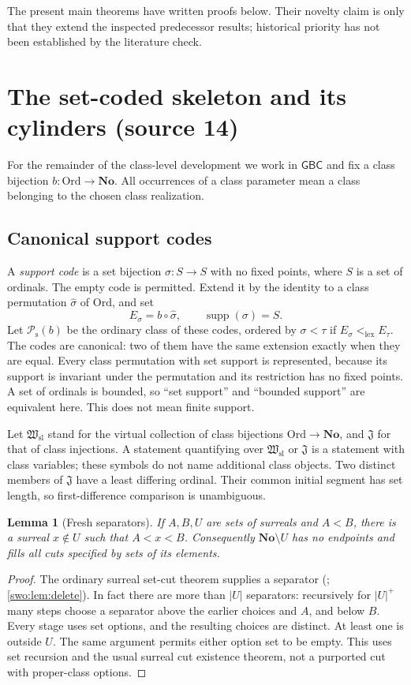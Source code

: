 \documentclass[11pt]{article}
\newtheorem{lemma}[lemma]{Lemma}
\theoremstyle{definition}
\theoremstyle{remark}
\newcommand{\No}{\mathbf{No}}
\newcommand{\Ord}{\mathrm{Ord}}
\newcommand{\Hsl}{\mathfrak W_{\mathrm{sl}}}
\newcommand{\Jinj}{\mathfrak J}
\newcommand{\Psupp}{\mathcal P_{\mathrm{s}}}
\newcommand{\lex}{\mathrm{lex}}
\newcommand{\supp}{\operatorname{supp}}
\newcommand{\GBC}{\mathsf{GBC}}
\begin{document}
The present main theorems have written proofs below. Their novelty claim
is only that they extend the inspected predecessor results; historical
priority has not been established by the literature check.

\section{The set-coded skeleton and its cylinders (source 14)}
\label{swo:tc:sec:core}
For the remainder of the class-level development we work in $\GBC$ and
fix a class bijection $b:\Ord\to\No$. All occurrences of a class
parameter mean a class belonging to the chosen class realization.

\subsection{Canonical support codes}
A \emph{support code} is a set bijection $\sigma:S\to S$ with no fixed
points, where $S$ is a set of ordinals. The empty code is permitted.
Extend it by the identity to a class permutation $\widehat\sigma$ of
$\Ord$, and set
\[
 E_\sigma=b\circ\widehat\sigma,
 \qquad \supp(\sigma)=S.
\]
Let $\Psupp(b)$ be the ordinary class of these codes, ordered by
$\sigma<\tau$ if $E_\sigma <_{\lex} E_\tau$. The codes are canonical:
two of them have the same extension exactly when they are equal.
Every class permutation with set support is represented, because its
support is invariant under the permutation and its restriction has no
fixed points. A set of ordinals is bounded, so ``set support'' and
``bounded support'' are equivalent here. This does not mean finite support.

Let $\Hsl$ stand for the virtual collection of class bijections
$\Ord\to\No$, and $\Jinj$ for that of class injections. A statement
quantifying over $\Hsl$ or $\Jinj$ is a statement with class variables;
these symbols do not name additional class objects. Two distinct members
of $\Jinj$ have a least differing ordinal. Their common initial segment
has set length, so first-difference comparison is unambiguous.

\begin{lemma}[Fresh separators]\label{swo:tc:lem:fresh}
If $A,B,U$ are sets of surreals and $A<B$, there is a surreal
$x\notin U$ such that $A<x<B$. Consequently $\No\setminus U$ has
no endpoints and fills all cuts specified by sets of its elements.
\end{lemma}
\begin{proof}
The ordinary surreal set-cut theorem supplies a separator
(\cite{Ehrlich2012}; \cref{swo:lem:delete}). In fact there
are more than $|U|$ separators: recursively for $|U|^+$ many steps choose
a separator above the earlier choices and $A$, and below $B$.
Every stage uses set options, and the resulting choices are distinct.
At least one is outside $U$. The same argument permits either option
set to be empty. This uses set recursion and the usual surreal cut
existence theorem, not a purported cut with proper-class options.
\end{proof}
\end{document}
